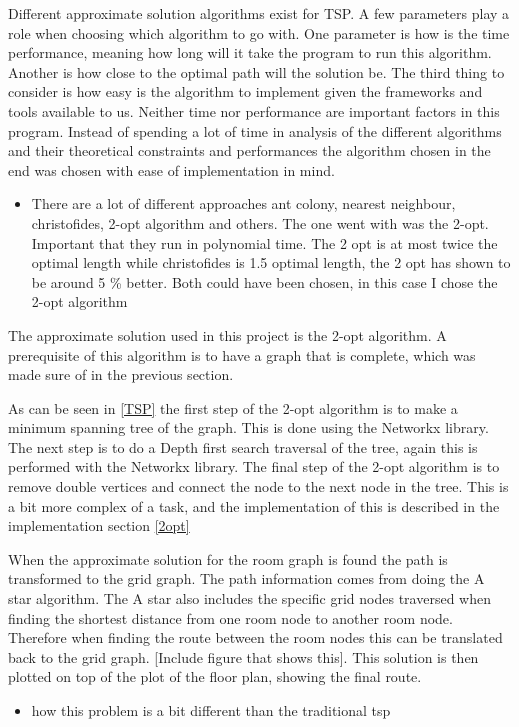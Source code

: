 Different approximate solution algorithms exist for TSP. A few parameters play a role when choosing which algorithm to go with. One parameter is how is the time performance, meaning how long will it take the program to run this algorithm. Another is how close to the optimal path will the solution be. The third thing to consider is how easy is the algorithm to implement given the frameworks and tools available to us.
Neither time nor performance are important factors in this program. Instead of spending a lot of time in analysis of the different algorithms and their theoretical constraints and performances the algorithm chosen in the end was chosen with ease of implementation in mind. %
\begin{itemize}
    \item There are a lot of different approaches ant colony, nearest neighbour, christofides, 2-opt algorithm and others. The one went with was the 2-opt. Important that they run in polynomial time. The 2 opt is at most twice the optimal length while christofides is 1.5 optimal length, the 2 opt has shown to be around 5 \% better. Both could have been chosen, in this case I chose the 2-opt algorithm
\end{itemize}


The approximate solution used in this project is the 2-opt algorithm. 
A prerequisite of this algorithm is to have a graph that is complete, which was made sure of in the previous section.

As can be seen in \ref{TSP} the first step of the 2-opt algorithm is to make a minimum spanning tree of the graph. This is done using the Networkx library. 
The next step is to do a Depth first search traversal of the tree, again this is performed with the Networkx library. 
The final step of the 2-opt algorithm is to remove double vertices and connect the node to the next node in the tree. This is a bit more complex of a task, and the implementation of this is described in the implementation section \ref{2opt}

When the approximate solution for the room graph is found the path is transformed to the grid graph. The path information comes from doing the A star algorithm. The A star also includes the specific grid nodes traversed when finding the shortest distance from one room node to another room node. Therefore when finding the route between the room nodes this can be translated back to the grid graph. [Include figure that shows this]. This solution is then plotted on top of the plot of the floor plan, showing the final route.


\begin{itemize}
    \item how this problem is a bit different than the traditional tsp
\end{itemize}

